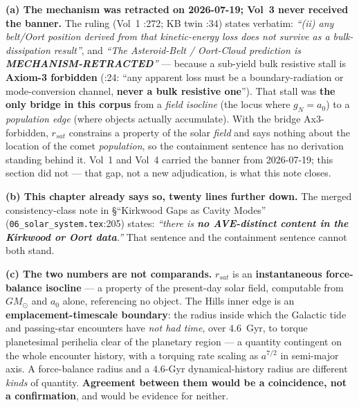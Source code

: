 \noindent\textbf{(a) The mechanism was retracted on 2026-07-19; Vol~3 never
received the banner.}  The ruling (Vol~1
:272; KB twin
:34)
states verbatim: \emph{``(ii) any belt/Oort position derived from that
kinetic-energy loss does not survive as a bulk-dissipation result''}, and
\emph{``The Asteroid-Belt / Oort-Cloud prediction is
\textbf{MECHANISM-RETRACTED}''} --- because a sub-yield bulk resistive stall is
\textbf{Axiom-3 forbidden} (:24:
``any apparent loss must be a boundary-radiation or mode-conversion channel,
\textbf{never a bulk resistive one}'').  That stall was \textbf{the only bridge
in this corpus} from a \emph{field isocline} (the locus where $g_N = a_0$) to a
\emph{population edge} (where objects actually accumulate).  With the bridge
Ax3-forbidden, $r_{sat}$ constrains a property of the solar \emph{field} and
says nothing about the location of the comet \emph{population}, so the
containment sentence has no derivation standing behind it.  Vol~1 and Vol~4
carried the banner from 2026-07-19; this section did not --- that gap, not a
new adjudication, is what this note closes.

\noindent\textbf{(b) This chapter already says so, twenty lines further down.}
The merged consistency-class note in \S``Kirkwood Gaps as Cavity Modes''
(\texttt{06\_solar\_system.tex}:205) states: \emph{``there is \textbf{no
AVE-distinct content in the Kirkwood or Oort data}.''}  That sentence and the
containment sentence cannot both stand.

\noindent\textbf{(c) The two numbers are not comparands.}  $r_{sat}$ is an
\textbf{instantaneous force-balance isocline} --- a property of the present-day
solar field, computable from $GM_\odot$ and $a_0$ alone, referencing no object.
The Hills inner edge is an \textbf{emplacement-timescale boundary}: the radius
inside which the Galactic tide and passing-star encounters have \emph{not had
time}, over $4.6$~Gyr, to torque planetesimal perihelia clear of the planetary
region --- a quantity contingent on the whole encounter history, with a
torquing rate scaling as $a^{7/2}$ in semi-major axis.  A force-balance radius
and a $4.6$-Gyr dynamical-history radius are different \emph{kinds} of
quantity.  \textbf{Agreement between them would be a coincidence, not a
confirmation}, and would be evidence for neither.

